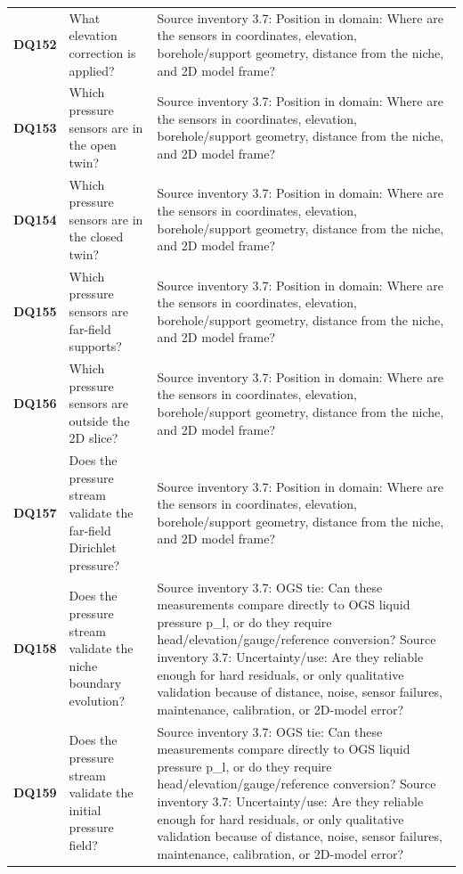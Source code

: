 \begin{longtable}{@{}L{0.09\textwidth} L{0.31\textwidth} L{0.52\textwidth}@{}}
\addlinespace[0.18em]
\textbf{DQ152} & What elevation correction is applied? & Source inventory 3.7: Position in domain: Where are the sensors in coordinates, elevation, borehole/support geometry, distance from the niche, and 2D model frame?\\
\addlinespace[0.18em]
\textbf{DQ153} & Which pressure sensors are in the open twin? & Source inventory 3.7: Position in domain: Where are the sensors in coordinates, elevation, borehole/support geometry, distance from the niche, and 2D model frame?\\
\addlinespace[0.18em]
\textbf{DQ154} & Which pressure sensors are in the closed twin? & Source inventory 3.7: Position in domain: Where are the sensors in coordinates, elevation, borehole/support geometry, distance from the niche, and 2D model frame?\\
\addlinespace[0.18em]
\textbf{DQ155} & Which pressure sensors are far-field supports? & Source inventory 3.7: Position in domain: Where are the sensors in coordinates, elevation, borehole/support geometry, distance from the niche, and 2D model frame?\\
\addlinespace[0.18em]
\textbf{DQ156} & Which pressure sensors are outside the 2D slice? & Source inventory 3.7: Position in domain: Where are the sensors in coordinates, elevation, borehole/support geometry, distance from the niche, and 2D model frame?\\
\addlinespace[0.18em]
\textbf{DQ157} & Does the pressure stream validate the far-field Dirichlet pressure? & Source inventory 3.7: Position in domain: Where are the sensors in coordinates, elevation, borehole/support geometry, distance from the niche, and 2D model frame?\\
\addlinespace[0.18em]
\textbf{DQ158} & Does the pressure stream validate the niche boundary evolution? & Source inventory 3.7: OGS tie: Can these measurements compare directly to OGS liquid pressure p\_l, or do they require head/elevation/gauge/reference conversion? Source inventory 3.7: Uncertainty/use: Are they reliable enough for hard residuals, or only qualitative validation because of distance, noise, sensor failures, maintenance, calibration, or 2D-model error?\\
\addlinespace[0.18em]
\textbf{DQ159} & Does the pressure stream validate the initial pressure field? & Source inventory 3.7: OGS tie: Can these measurements compare directly to OGS liquid pressure p\_l, or do they require head/elevation/gauge/reference conversion? Source inventory 3.7: Uncertainty/use: Are they reliable enough for hard residuals, or only qualitative validation because of distance, noise, sensor failures, maintenance, calibration, or 2D-model error?\\

\end{longtable}
